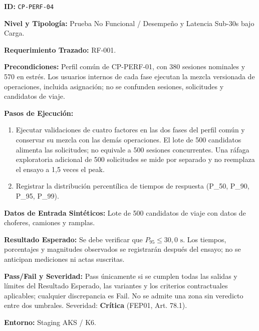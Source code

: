 \par\noindent \textbf{ID:} \texttt{CP-\allowbreak{}PERF-\allowbreak{}04}\par
\par\noindent \textbf{Nivel y Tipología:} Prueba No Funcional / Desempeño y Latencia Sub-30s bajo Carga.\par
\par\noindent \textbf{Requerimiento Trazado:} RF-001.\par
\par\noindent \textbf{Precondiciones:} Perfil común de CP-PERF-01, con 380 sesiones nominales y 570 en estrés. Los usuarios internos de cada fase ejecutan la mezcla versionada de operaciones, incluida asignación; no se confunden sesiones, solicitudes y candidatos de viaje.\par
\par\noindent \textbf{Pasos de Ejecución:}\par
\begin{enumerate}
\item Ejecutar validaciones de cuatro factores en las dos fases del perfil común y conservar su mezcla con las demás operaciones. El lote de 500 candidatos alimenta las solicitudes; no equivale a 500 sesiones concurrentes. Una ráfaga exploratoria adicional de 500 solicitudes se mide por separado y no reemplaza el ensayo a 1,5 veces el peak.
\item Registrar la distribución percentílica de tiempos de respuesta (P\_{50}, P\_{90}, P\_{95}, P\_{99}).
\end{enumerate}

\par\noindent \textbf{Datos de Entrada Sintéticos:} Lote de 500 candidatos de viaje con datos de choferes, camiones y ramplas.\par
\par\noindent \textbf{Resultado Esperado:} Se debe verificar que $P_{95} \le 30{,}0\text{ s}$. Los tiempos, porcentajes y magnitudes observados se registrarán después del ensayo; no se anticipan mediciones ni actas suscritas.\par
\par\noindent \textbf{Pass/Fail y Severidad:} Pass únicamente si se cumplen todas las salidas y límites del Resultado Esperado, las variantes y los criterios contractuales aplicables; cualquier discrepancia es Fail. No se admite una zona sin veredicto entre dos umbrales. Severidad: \textbf{Crítica} (FEP01, Art. 78.1).\par
\par\noindent \textbf{Entorno:} Staging AKS / K6.\par



